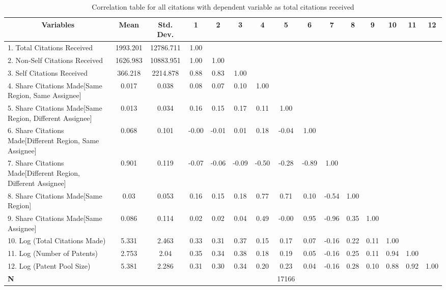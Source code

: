 \begin{table}[htbp]\centering \caption{Correlation table for all citations  with dependent variable as total citations received\label{a.e.o.t.n.tcorrelation}}
\scriptsize
\onehalfspacing
\begin{adjustbox}{angle=90}
\begin{tabular}{l  c  c  c  c  c  c  c  c  c  c  c  c  c  c }\hline\hline
\multicolumn{1}{c}{Variables} & \textbf{Mean}& \textbf{Std. Dev.}&1&2&3&4&5&6&7&8&9&10&11&12\\ \hline
1. Total Citations Received& 1993.201 & 12786.711&1.00\\
2. Non-Self Citations Received& 1626.983 & 10883.951&1.00&1.00\\
3. Self Citations Received& 366.218 & 2214.878&0.88&0.83&1.00\\
4. Share Citations Made[Same Region, Same Assignee]& 0.017 & 0.038&0.08&0.07&0.10&1.00\\
5. Share Citations Made[Same Region, Different Assignee]& 0.013 & 0.034&0.16&0.15&0.17&0.11&1.00\\
6. Share Citations Made[Different Region, Same Assignee]& 0.068 & 0.101&-0.00&-0.01&0.01&0.18&-0.04&1.00\\
7. Share Citations Made[Different Region, Different Assignee]& 0.901 & 0.119&-0.07&-0.06&-0.09&-0.50&-0.28&-0.89&1.00\\
8. Share Citations Made[Same Region]& 0.03 & 0.053&0.16&0.15&0.18&0.77&0.71&0.10&-0.54&1.00\\
9. Share Citations Made[Same Assignee]& 0.086 & 0.114&0.02&0.02&0.04&0.49&-0.00&0.95&-0.96&0.35&1.00\\
10. Log (Total Citations Made) & 5.331 & 2.463&0.33&0.31&0.37&0.15&0.17&0.07&-0.16&0.22&0.11&1.00\\
11. Log (Number of Patents)& 2.753 & 2.04&0.35&0.34&0.38&0.18&0.19&0.05&-0.16&0.25&0.11&0.94&1.00\\
12. Log (Patent Pool Size)& 5.381 & 2.286&0.31&0.30&0.34&0.20&0.23&0.04&-0.16&0.28&0.10&0.88&0.92&1.00\\
\hline
\textbf{N}&&&&&&&17166\\
\hline \hline 
 \end{tabular}
 \end{adjustbox}
\end{table}
